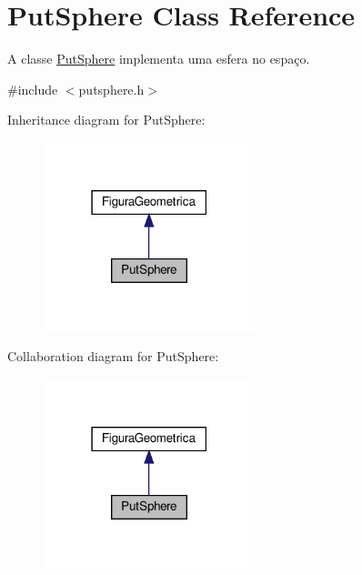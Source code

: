 \hypertarget{class_put_sphere}{}\section{Put\+Sphere Class Reference}
\label{class_put_sphere}


A classe \hyperlink{class_put_sphere}{Put\+Sphere} implementa uma esfera no espaço.  




{\ttfamily \#include $<$putsphere.\+h$>$}



Inheritance diagram for Put\+Sphere\+:
\nopagebreak
\begin{figure}[H]
\begin{center}
\leavevmode
\includegraphics[width=174pt]{class_put_sphere__inherit__graph}
\end{center}
\end{figure}


Collaboration diagram for Put\+Sphere\+:
\nopagebreak
\begin{figure}[H]
\begin{center}
\leavevmode
\includegraphics[width=174pt]{class_put_sphere__coll__graph}
\end{center}
\end{figure}
